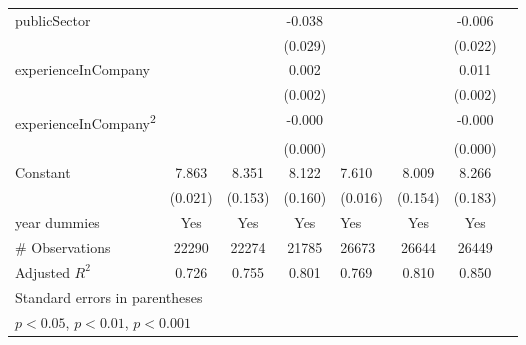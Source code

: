 \begin{longtable}{l*{3}{c}|l*{3}{c}}
		publicSector      &                     &                     &      -0.038         &                     &                     &      -0.006         \\
		&                     &                     &     (0.029)         &                     &                     &     (0.022)         \\
		experienceInCompany &                     &                     &       0.002         &                     &                     &       0.011\sym{***}\\
		&                     &                     &     (0.002)         &                     &                     &     (0.002)         \\
		experienceInCompany\textsuperscript{2}&                     &                     &      -0.000         &                     &                     &      -0.000\sym{***}\\
		&                     &                     &     (0.000)         &                     &                     &     (0.000)         \\
		Constant            &       7.863\sym{***}&       8.351\sym{***}&       8.122\sym{***}&       7.610\sym{***}&       8.009\sym{***}&       8.266\sym{***}\\
		&     (0.021)         &     (0.153)         &     (0.160)         &     (0.016)         &     (0.154)         &     (0.183)         \\
		year dummies        &         Yes         &         Yes         &         Yes         &         Yes         &         Yes         &         Yes         \\
		\midrule
	\#	Observations        &       22290         &       22274         &       21785         &       26673         &       26644         &       26449         \\
		Adjusted \(R^{2}\)  &       0.726         &       0.755         &       0.801         &       0.769         &       0.810         &       0.850         \\
		\bottomrule
		\multicolumn{7}{l}{\footnotesize Standard errors in parentheses}\\
		\multicolumn{7}{l}{\footnotesize \sym{*} \(p<0.05\), \sym{**} \(p<0.01\), \sym{***} \(p<0.001\)}
          \label{tab:et_wage_full}
	\end{longtable}

\clearpage


